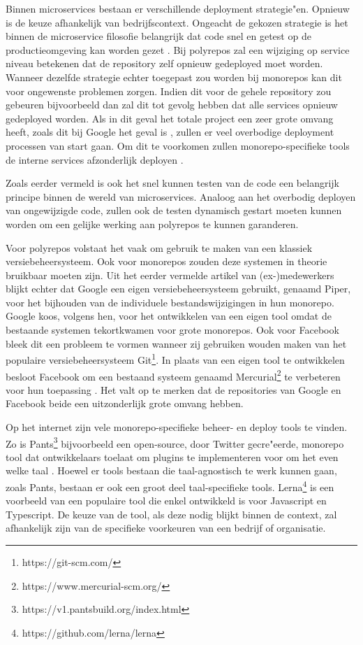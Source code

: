 \documentclass{hogent-article}
\begin{document}
Binnen microservices bestaan er verschillende deployment strategie"en. Opnieuw is de keuze afhankelijk van bedrijfscontext. Ongeacht de gekozen strategie is het binnen de microservice filosofie belangrijk dat code snel en getest op de productieomgeving kan worden gezet \autocite{Richardson2019}.
Bij polyrepos zal een wijziging op service niveau betekenen dat de repository zelf opnieuw gedeployed moet worden. Wanneer dezelfde strategie echter toegepast zou worden bij monorepos kan dit voor ongewenste problemen zorgen. Indien dit voor de gehele repository zou gebeuren bijvoorbeeld dan zal dit tot gevolg hebben dat alle services opnieuw gedeployed worden. Als in dit geval het totale project een zeer grote omvang heeft, zoals dit bij Google het geval is \autocite{Potvin&Levenberg2016}, zullen er veel overbodige deployment processen van start gaan. Om dit te voorkomen zullen monorepo-specifieke tools de interne services afzonderlijk deployen \autocite{Matei2020}. 

Zoals eerder vermeld is ook het snel kunnen testen van de code een belangrijk principe binnen de wereld van microservices. Analoog aan het overbodig deployen van ongewijzigde code, zullen ook de testen dynamisch gestart moeten kunnen worden om een gelijke werking aan polyrepos te kunnen garanderen. 

Voor polyrepos volstaat het vaak om gebruik te maken van een klassiek versiebeheersysteem. Ook voor monorepos zouden deze systemen in theorie bruikbaar moeten zijn.  
Uit het eerder vermelde artikel van (ex-)medewerkers \textcite{Potvin&Levenberg2016} blijkt echter dat Google een eigen versiebeheersysteem gebruikt, genaamd Piper, voor het bijhouden van de individuele bestandswijzigingen in hun monorepo. Google koos, volgens hen, voor het ontwikkelen van een eigen tool omdat de bestaande systemen tekortkwamen voor grote monorepos.  Ook voor Facebook bleek dit een probleem te vormen wanneer zij gebruiken wouden maken van het populaire versiebeheersysteem Git\footnote{https://git-scm.com/}. In plaats van een eigen tool te ontwikkelen besloot Facebook om een bestaand systeem genaamd Mercurial\footnote{https://www.mercurial-scm.org/} te verbeteren voor hun toepassing \autocite{Goode2014}.
Het valt op te merken dat de repositories van Google en Facebook beide een uitzonderlijk grote omvang hebben.

Op het internet zijn vele monorepo-specifieke beheer- en deploy tools te vinden. Zo is Pants\footnote{https://v1.pantsbuild.org/index.html} bijvoorbeeld een open-source, door Twitter gecre"eerde, monorepo tool dat ontwikkelaars toelaat om plugins te implementeren voor om het even welke taal \autocite{Olson2016}. Hoewel er tools bestaan die taal-agnostisch te werk kunnen gaan, zoals Pants, bestaan er ook een groot deel taal-specifieke tools. Lerna\footnote{https://github.com/lerna/lerna} is een voorbeeld van een populaire tool die enkel ontwikkeld is voor Javascript en Typescript. De keuze van de tool, als deze nodig blijkt binnen de context, zal afhankelijk zijn van de specifieke voorkeuren van een bedrijf of organisatie.
\end{document}
